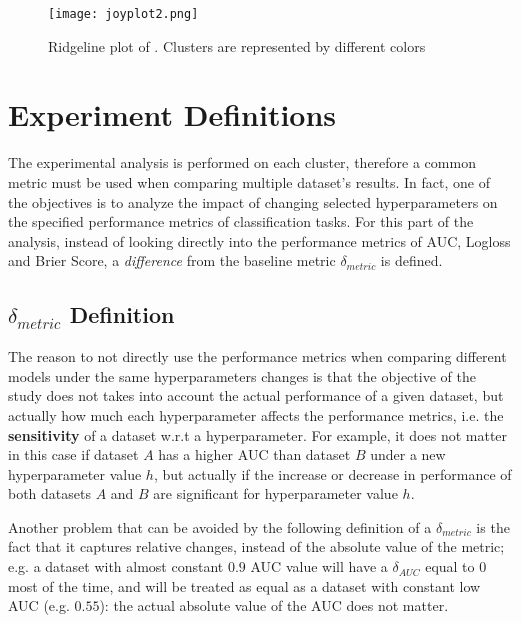 \begin{figure}[H]
    \centering
    \texttt{[image: joyplot2.png]}
    \caption{Ridgeline plot of . Clusters are represented by different colors}
    \label{fig:joyplot-2}
\end{figure}


\section{Experiment Definitions}

The experimental analysis is performed on each cluster, therefore a common metric must be used when comparing multiple dataset's results. In fact, one of the objectives is to analyze the impact of changing selected hyperparameters on the specified performance metrics of classification tasks. For this part of the analysis, instead of looking directly into the performance metrics of AUC, Logloss and Brier Score, a \textit{difference} from the baseline metric $\delta_{metric}$ is defined.

\subsection{\texorpdfstring{$\delta_{metric}$}{delta} Definition}
\label{subsec:delta-metrics}

The reason to not directly use the performance metrics when comparing different models under the same hyperparameters changes is that the objective of the study does not takes into account the actual performance of a given dataset, but actually how much each hyperparameter affects the performance metrics, i.e. the \textbf{sensitivity} of a dataset w.r.t a hyperparameter. For example, it does not matter in this case if dataset $A$ has a higher AUC than dataset $B$ under a new hyperparameter value $h$, but actually if the increase or decrease in performance of both datasets $A$ and $B$ are significant for hyperparameter value $h$. 

Another problem that can be avoided by the following definition of a $\delta_{metric}$ is the fact that it captures relative changes, instead of the absolute value of the metric; e.g. a dataset with almost constant $0.9$ AUC value will have a $\delta_{AUC}$ equal to $0$ most of the time, and will be treated as equal as a dataset with constant low AUC (e.g. $0.55$): the actual absolute value of the AUC does not matter.

